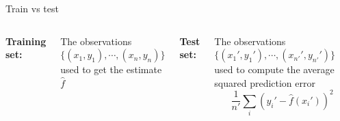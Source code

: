 \documentclass[aspectratio=169,dvipsnames]{beamer}
\begin{document}
\begin{frame}[t]{Train vs test}

\begin{columns}
\centering
\textbf{Training set: }

The observations $\{(x_1,y_1),\cdots,(x_n,y_n)\}$ used to get the estimate $\hat f$
\centering

\textbf{Test set: }

The observations $\{(x_1',y_1'),\cdots,(x_{n'}',y_{n'}')\}$ used to compute the average squared prediction error
\begin{equation*}
	\frac{1}{n'}\sum_{i} (y_i' - \hat f(x_i'))^2
\end{equation*}
\end{columns}

\end{frame}
\end{document}
